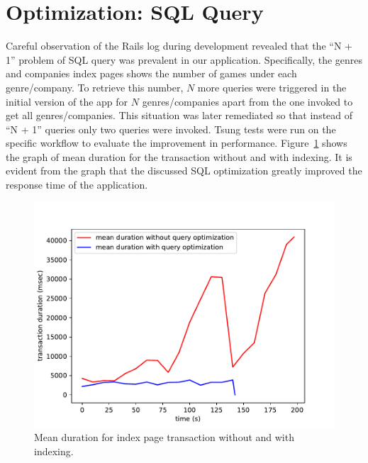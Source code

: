 \section{Optimization: SQL Query}
Careful observation of the Rails log during development revealed that the ``N + 1'' problem of SQL query was prevalent in our application. Specifically, the genres and companies index pages shows the number of games under each genre/company. To retrieve this number, $N$ more queries were triggered in the initial version of the app for $N$ genres/companies apart from the one invoked to get all genres/companies. This situation was later remediated so that instead of ``N + 1'' queries only two queries were invoked. Tsung tests were run on the specific workflow to evaluate the improvement in performance. Figure~\ref{fig:sqlopt} shows the graph of mean duration for the transaction without and with indexing. It is evident from the graph that the discussed SQL optimization greatly improved the response time of the application.
\begin{figure}
	\centering
	\includegraphics{images/list-pages-transaction-duration-without-query-with-query}
	\caption{Mean duration for index page transaction without and with indexing.}\label{fig:sqlopt}
\end{figure}

